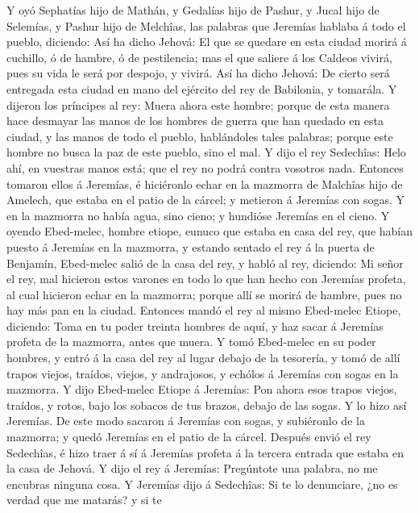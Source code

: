  Y oyó Sephatías hijo de Mathán, y Gedalías hijo de Pashur,
y Jucal hijo de Selemías, y Pashur hijo de Melchîas, las palabras que
Jeremías hablaba á todo el pueblo, diciendo:  Así ha dicho
Jehová: El que se quedare en esta ciudad morirá á cuchillo, ó de hambre,
ó de pestilencia; mas el que saliere á los Caldeos vivirá, pues su vida
le será por despojo, y vivirá.  Así ha dicho Jehová: De
cierto será entregada esta ciudad en mano del ejército del rey de
Babilonia, y tomarála.  Y dijeron los príncipes al rey:
Muera ahora este hombre; porque de esta manera hace desmayar las manos
de los hombres de guerra que han quedado en esta ciudad, y las manos de
todo el pueblo, hablándoles tales palabras; porque este hombre no busca
la paz de este pueblo, sino el mal.  Y dijo el rey
Sedechîas: Helo ahí, en vuestras manos está; que el rey no podrá contra
vosotros nada.  Entonces tomaron ellos á Jeremías, é
hiciéronlo echar en la mazmorra de Malchîas hijo de Amelech, que estaba
en el patio de la cárcel; y metieron á Jeremías con sogas. Y en la
mazmorra no había agua, sino cieno; y hundióse Jeremías en el cieno.
 Y oyendo Ebed-melec, hombre etiope, eunuco que estaba en
casa del rey, que habían puesto á Jeremías en la mazmorra, y estando
sentado el rey á la puerta de Benjamín,  Ebed-melec salió de
la casa del rey, y habló al rey, diciendo:  Mi señor el rey,
mal hicieron estos varones en todo lo que han hecho con Jeremías
profeta, al cual hicieron echar en la mazmorra; porque allí se morirá de
hambre, pues no hay más pan en la ciudad.  Entonces mandó
el rey al mismo Ebed-melec Etiope, diciendo: Toma en tu poder treinta
hombres de aquí, y haz sacar á Jeremías profeta de la mazmorra, antes
que muera.  Y tomó Ebed-melec en su poder hombres, y entró
á la casa del rey al lugar debajo de la tesorería, y tomó de allí trapos
viejos, traídos, viejos, y andrajosos, y echólos á Jeremías con sogas en
la mazmorra.  Y dijo Ebed-melec Etiope á Jeremías: Pon
ahora esos trapos viejos, traídos, y rotos, bajo los sobacos de tus
brazos, debajo de las sogas. Y lo hizo así Jeremías.  De
este modo sacaron á Jeremías con sogas, y subiéronlo de la mazmorra; y
quedó Jeremías en el patio de la cárcel.  Después envió el
rey Sedechîas, é hizo traer á sí á Jeremías profeta á la tercera entrada
que estaba en la casa de Jehová. Y dijo el rey á Jeremías: Pregúntote
una palabra, no me encubras ninguna cosa.  Y Jeremías dijo
á Sedechîas: Si te lo denunciare, ¿no es verdad que me matarás? y si te
